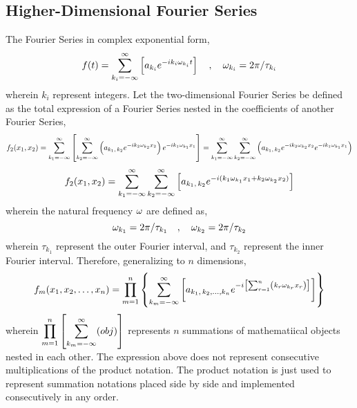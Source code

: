 \documentclass[a4paper, 12pt]{report}
\begin{document}
\begin{center}
\section{Higher-Dimensional Fourier Series}
\begin{comment}
\end{comment}
The Fourier Series in complex exponential form,
$$f(t) = \sum^{\infty}_{k_i = -\infty}\left[a_{k_i}e^{-ik_i\omega_{k_i}t}\right]\quad,\quad \omega_{k_i} = 2\pi/\tau_{k_i}$$
wherein $k_i$ represent integers. Let the two-dimensional Fourier Series be defined as the total expression of a Fourier Series nested in the coefficients of another Fourier Series,
$$f_2(x_1,x_2) = \sum^{\infty}_{k_1 = -\infty}\left[\sum^{\infty}_{k_2 = -\infty}\left(a_{k_1,\,k_2}e^{-ik_2\omega_{k_2}x_2}\right)e^{-ik_1\omega_{k_1}x_1}\right] = \sum^{\infty}_{k_1 = -\infty}\sum^{\infty}_{k_2 = -\infty}\left(a_{k_1,\,k_2}e^{-ik_2\omega_{k_2}x_2}e^{-ik_1\omega_{k_1}x_1}\right)$$
$$f_2(x_1,x_2) = \sum^{\infty}_{k_1 = -\infty}\sum^{\infty}_{k_2 = -\infty}\left[a_{k_1,\,k_2}e^{-i(k_1\omega_{k_1}x_1+k_2\omega_{k_2}x_2)}\right]$$
wherein the natural frequency $\omega$ are defined as,
$$\omega_{k_1} = 2\pi/\tau_{k_1} \quad,\quad \omega_{k_2} = 2\pi/\tau_{k_2}$$
wherein $\tau_{k_1}$ represent the outer Fourier interval, and $\tau_{k_2}$ represent the inner Fourier interval. Therefore, generalizing to $n$ dimensions,
$$f_m(x_1,x_2,\dots,x_n) = \prod^{n}_{m=1}\left\{\sum^{\infty}_{k_m = -\infty}\left[a_{k_1,\,k_2,\dots,k_n}e^{-i\left[\sum^{n}_{r=1}\left(k_r\omega_{k_r}x_r\right)\right]}\right]\right\}$$
wherein $\displaystyle{\prod^{n}_{m=1}\left[\sum^{\infty}_{k_m = -\infty}(obj)\right]}$ represents $n$ summations of mathematiical objects nested in each other. The expression above does not represent consecutive multiplications of the product notation. The product notation is just used to represent summation notations placed side by side and implemented consecutively in any order. 
\end{center}
\end{document}
